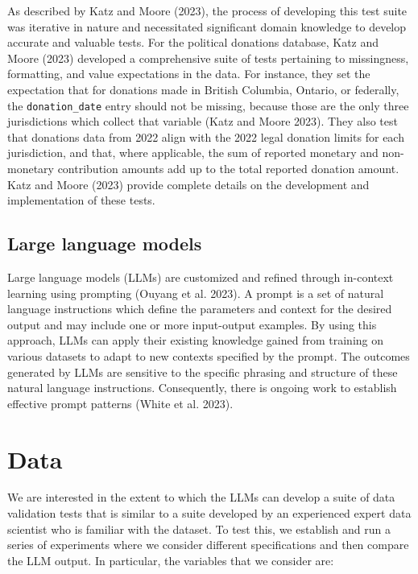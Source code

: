 \documentclass[
  letterpaper,
  DIV=11,
  numbers=noendperiod]{scrartcl}
\begin{document}
As described by Katz and Moore (2023), the process of developing this
test suite was iterative in nature and necessitated significant domain
knowledge to develop accurate and valuable tests. For the political
donations database, Katz and Moore (2023) developed a comprehensive
suite of tests pertaining to missingness, formatting, and value
expectations in the data. For instance, they set the expectation that
for donations made in British Columbia, Ontario, or federally, the
\texttt{donation\_date} entry should not be missing, because those are
the only three jurisdictions which collect that variable (Katz and Moore
2023). They also test that donations data from 2022 align with the 2022
legal donation limits for each jurisdiction, and that, where applicable,
the sum of reported monetary and non-monetary contribution amounts add
up to the total reported donation amount. Katz and Moore (2023) provide
complete details on the development and implementation of these tests.

\hypertarget{large-language-models}{%
\subsection{Large language models}\label{large-language-models}}

Large language models (LLMs) are customized and refined through
in-context learning using prompting (Ouyang et al. 2023). A prompt is a
set of natural language instructions which define the parameters and
context for the desired output and may include one or more input-output
examples. By using this approach, LLMs can apply their existing
knowledge gained from training on various datasets to adapt to new
contexts specified by the prompt. The outcomes generated by LLMs are
sensitive to the specific phrasing and structure of these natural
language instructions. Consequently, there is ongoing work to establish
effective prompt patterns (White et al. 2023).

\hypertarget{sec-data}{%
\section{Data}\label{sec-data}}

We are interested in the extent to which the LLMs can develop a suite of
data validation tests that is similar to a suite developed by an
experienced expert data scientist who is familiar with the dataset. To
test this, we establish and run a series of experiments where we
consider different specifications and then compare the LLM output. In
particular, the variables that we consider are:
\end{document}
